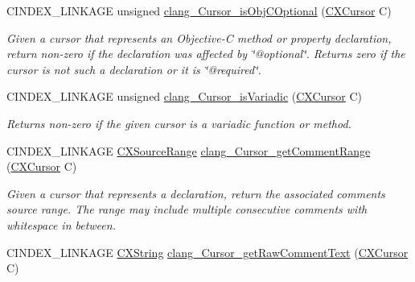 \begin{DoxyCompactItemize}
\mbox{\label{group__CINDEX__CURSOR__XREF_ga1dcb3b9d9471aebb2167c93b47c018b8}} 
C\+I\+N\+D\+E\+X\+\_\+\+L\+I\+N\+K\+A\+GE unsigned \mbox{\hyperlink{group__CINDEX__CURSOR__XREF_ga1dcb3b9d9471aebb2167c93b47c018b8}{clang\+\_\+\+Cursor\+\_\+is\+Obj\+C\+Optional}} (\mbox{\hyperlink{structCXCursor}{C\+X\+Cursor}} C)
\begin{DoxyCompactList}\small\item\em Given a cursor that represents an Objective-\/C method or property declaration, return non-\/zero if the declaration was affected by \char`\"{}@optional\char`\"{}. Returns zero if the cursor is not such a declaration or it is \char`\"{}@required\char`\"{}. \end{DoxyCompactList}\item 
\mbox{\label{group__CINDEX__CURSOR__XREF_ga3a9a5766db391fa5ca88b347651e5b8e}} 
C\+I\+N\+D\+E\+X\+\_\+\+L\+I\+N\+K\+A\+GE unsigned \mbox{\hyperlink{group__CINDEX__CURSOR__XREF_ga3a9a5766db391fa5ca88b347651e5b8e}{clang\+\_\+\+Cursor\+\_\+is\+Variadic}} (\mbox{\hyperlink{structCXCursor}{C\+X\+Cursor}} C)
\begin{DoxyCompactList}\small\item\em Returns non-\/zero if the given cursor is a variadic function or method. \end{DoxyCompactList}\item 
\mbox{\label{group__CINDEX__CURSOR__XREF_gab5e05b0cc042fbd91ecaf1790ece0ecc}} 
C\+I\+N\+D\+E\+X\+\_\+\+L\+I\+N\+K\+A\+GE \mbox{\hyperlink{structCXSourceRange}{C\+X\+Source\+Range}} \mbox{\hyperlink{group__CINDEX__CURSOR__XREF_gab5e05b0cc042fbd91ecaf1790ece0ecc}{clang\+\_\+\+Cursor\+\_\+get\+Comment\+Range}} (\mbox{\hyperlink{structCXCursor}{C\+X\+Cursor}} C)
\begin{DoxyCompactList}\small\item\em Given a cursor that represents a declaration, return the associated comment\textquotesingle{}s source range. The range may include multiple consecutive comments with whitespace in between. \end{DoxyCompactList}\item 
\mbox{\label{group__CINDEX__CURSOR__XREF_ga32905a8b1858e67cf5d28b7ad7150779}} 
C\+I\+N\+D\+E\+X\+\_\+\+L\+I\+N\+K\+A\+GE \mbox{\hyperlink{structCXString}{C\+X\+String}} \mbox{\hyperlink{group__CINDEX__CURSOR__XREF_ga32905a8b1858e67cf5d28b7ad7150779}{clang\+\_\+\+Cursor\+\_\+get\+Raw\+Comment\+Text}} (\mbox{\hyperlink{structCXCursor}{C\+X\+Cursor}} C)

\end{DoxyCompactItemize}
